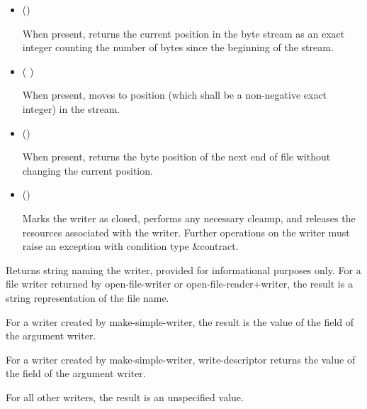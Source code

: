 \begin{entry}{%
}
\begin{itemize}
   may or may not be a bytes object returned by {\cf
    make-i/o-buffer}, but {\cf writer-write!} may operate more
  efficiently if it is.
  
   may or may not be the same as the chunk size of the
  reader, but {\cf writer-write!} may operate more
  efficiently if it is.

\item {\cf ()}
   
  When present,  returns the current position in the byte
  stream as an exact integer counting the number of bytes since the
  beginning of the stream.
   
\item {\cf ( )}
   
  When present,  moves to position  (which shall be a
  non-negative exact integer) in the stream.
  
\item {\cf ()}
   
    When present,  returns the byte position of the next end
    of file without changing the current position.
   
\item {\cf ()}
  
  Marks the writer as closed, performs any necessary
  cleanup, and releases the resources associated with the writer. Further
  operations on the writer must raise an exception with condition type
  {\cf\&contract}.
\end{itemize}
\end{entry}

\begin{entry}{%
}
   
Returns string naming the writer, provided for informational
purposes only. For a file writer returned by {\cf open-file-writer}
or {\cf open-file-reader+writer}, the result is a string
representation of the file name.
   
For a writer created by {\cf make-simple-writer}, the result is the
value of the  field of the argument writer.
\end{entry}

\begin{entry}{%
}
   
  For a writer created by {\cf make-simple-writer}, {\cf write-descriptor} 
  returns the value of the
   field of the argument writer.
  
  For all other writers, the result is an unspecified value.
\end{entry}

